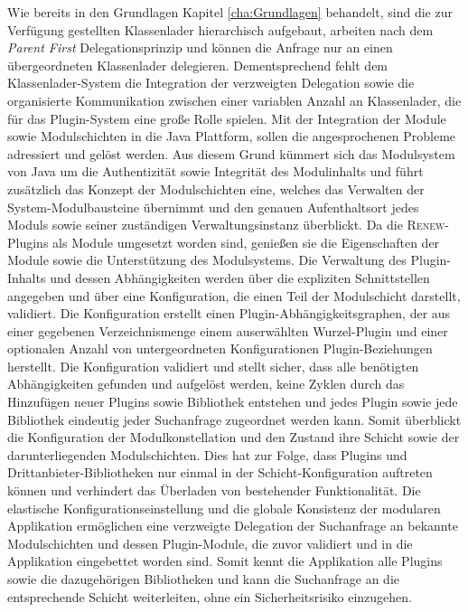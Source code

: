 	Wie bereits in den Grundlagen Kapitel \ref{cha:Grundlagen} behandelt, sind die zur Verfügung gestellten Klassenlader hierarchisch aufgebaut, arbeiten nach dem \textit{Parent First} Delegationsprinzip und können die Anfrage nur an einen übergeordneten Klassenlader delegieren. Dementsprechend fehlt dem Klassenlader-System die Integration der verzweigten Delegation sowie die organisierte Kommunikation zwischen einer variablen Anzahl an Klassenlader, die für das Plugin-System eine große Rolle spielen.\newline
	Mit der Integration der Module sowie Modulschichten in die Java Plattform, sollen die angesprochenen Probleme adressiert und gelöst werden. Aus diesem Grund kümmert sich das Modulsystem von Java um die Authentizität sowie Integrität des Modulinhalts und führt zusätzlich das Konzept der Modulschichten eine, welches das Verwalten der System-Modulbausteine übernimmt und den genauen Aufenthaltsort jedes Moduls sowie seiner zuständigen Verwaltungsinstanz überblickt. Da die \textsc{Renew}-Plugins als Module umgesetzt worden sind, genießen sie die Eigenschaften der Module sowie die Unterstützung des Modulsystems.\newline
	Die Verwaltung des Plugin-Inhalts und dessen Abhängigkeiten werden über die expliziten Schnittstellen angegeben und über eine Konfiguration, die einen Teil der Modulschicht darstellt, validiert. Die Konfiguration erstellt einen Plugin-Abhängigkeitsgraphen, der aus einer gegebenen Verzeichnismenge einem auserwählten Wurzel-Plugin und einer optionalen Anzahl von untergeordneten Konfigurationen Plugin-Beziehungen herstellt. Die Konfiguration validiert und stellt sicher, dass alle benötigten Abhängigkeiten gefunden und aufgelöst werden, keine Zyklen durch das Hinzufügen neuer Plugins sowie Bibliothek entstehen und jedes Plugin sowie jede Bibliothek eindeutig jeder Suchanfrage zugeordnet werden kann. Somit überblickt die Konfiguration der Modulkonstellation und den Zustand ihre Schicht sowie der darunterliegenden Modulschichten. Dies hat zur Folge, dass Plugins und Drittanbieter-Bibliotheken nur einmal in der Schicht-Konfiguration auftreten können und verhindert das Überladen von bestehender Funktionalität.\newline
	Die elastische Konfigurationseinstellung und die globale Konsistenz der modularen Applikation ermöglichen eine verzweigte Delegation der Suchanfrage an bekannte Modulschichten und dessen Plugin-Module, die zuvor validiert und in die Applikation eingebettet worden sind. Somit kennt die Applikation alle Plugins sowie die dazugehörigen Bibliotheken und kann die Suchanfrage an die entsprechende Schicht weiterleiten, ohne ein Sicherheitsrisiko einzugehen.\newline
